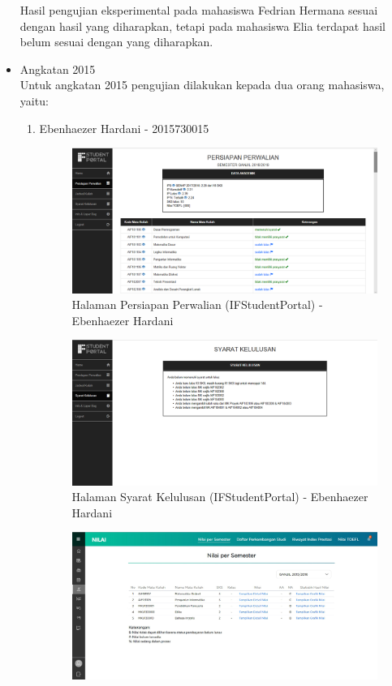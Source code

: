 \begin{itemize}
\begin{enumerate}
	\end{enumerate}
	Hasil pengujian eksperimental pada mahasiswa Fedrian Hermana sesuai dengan hasil yang diharapkan, tetapi pada mahasiswa Elia terdapat hasil belum sesuai dengan yang diharapkan.
	\item Angkatan 2015 \\
	Untuk angkatan 2015 pengujian dilakukan kepada dua orang mahasiswa, yaitu:
	\begin{enumerate}
		\item Ebenhaezer Hardani - 2015730015
		\begin{figure}[H]
			\centering
			\includegraphics[scale=0.45]{Gambar/HasilPengujian/2015_1_persiapan_perwalian_ifstudentportal}
			\caption{Halaman Persiapan Perwalian (IFStudentPortal) - Ebenhaezer Hardani}
			\label{fig:2015_1_persiapan_perwalian_ifstudentportal}
		\end{figure}
		\begin{figure}[H]
			\centering
			\includegraphics[scale=0.45]{Gambar/HasilPengujian/2015_1_syarat_kelulusan_ifstudentportal}
			\caption{Halaman Syarat Kelulusan (IFStudentPortal) - Ebenhaezer Hardani}
			\label{fig:2015_1_syarat_kelulusan_ifstudentportal}
		\end{figure}
		\begin{figure}[H]
			\centering
			\includegraphics[scale=0.45]{Gambar/HasilPengujian/2015_1_nps_studentportal}

\end{figure}
\end{enumerate}
\end{itemize}
